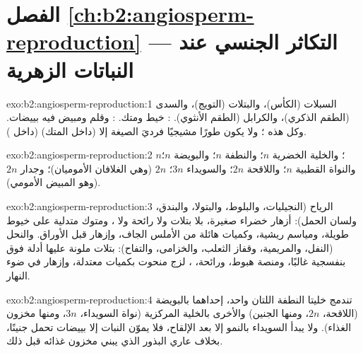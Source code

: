 \section*{الفصل \ref{ch:b2:angiosperm-reproduction} --- التكاثر الجنسي عند النباتات الزهرية}

\begin{solution}{exo:b2:angiosperm-reproduction:1}
السبلات (الكأس)، والبتلات (التويج)، والسدى (الطقم الذكري)، والكرابل
(الطقم الأنثوي). : خيط ومتك. :  وقلم ومبيض فيه
بييضات. وكل هذه  ؛ ولا يكون طورًا مشيجيًا فرديَ
الصيغة إلا  (داخل المتك)  (داخل ).
\end{solution}

\begin{solution}{exo:b2:angiosperm-reproduction:2}
 $n$؛ والخلية الخضرية $n$؛ والنطفة $n$؛ والبويضة $n$؛
والنواة القطبية $n$؛ واللاقحة $2n$؛ والسويداء $3n$؛ 
$2n$ (وهي الغلافان الأموميان)؛ وجدار  $2n$ (وهو المبيض الأمومي).
\end{solution}

\begin{solution}{exo:b2:angiosperm-reproduction:3}
الرياح (النجيليات، والبلوط، والبتولا، والبندق، ولسان الحمل): أزهار
خضراء صغيرة، بلا بتلات ولا رائحة ولا ، ومتوك متدلية على خيوط
طويلة، ومياسم ريشية، وكميات هائلة من  الأملس الجاف، وإزهار قبل
الأوراق. والنحل (النفل، والمريمية، وقفاز الثعلب، والخزامى، والتفاح):
بتلات ملونة عليها أدلة فوق بنفسجية غالبًا، ومنصة هبوط، ورائحة،
،  لزج منحوت بكميات معتدلة، وإزهار في ضوء النهار.
\end{solution}

\begin{solution}{exo:b2:angiosperm-reproduction:4}
تندمج خليتا النطفة اللتان  واحد، إحداهما بالبويضة
(اللاقحة، $2n$، ومنها الجنين) والأخرى بالخلية المركزية (نواة
السويداء، $3n$، ومنها مخزون الغذاء). ولا يبدأ السويداء بالنمو إلا
بعد الإلقاح، فلا يموّن النبات إلا بييضات تحمل جنينًا، بخلاف عاري
البذور الذي يبني مخزون غذائه قبل ذلك.
\end{solution}

